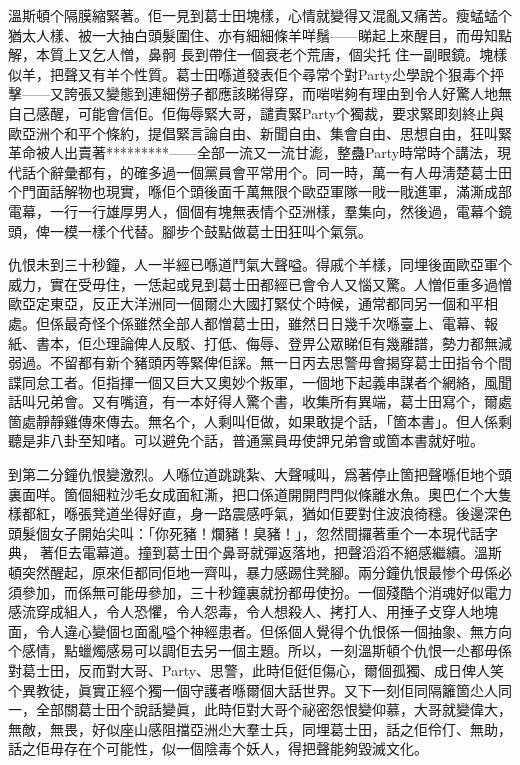 溫斯頓个隔膜縮緊著。佢一見到葛士田塊樣，心情就變得又混亂又痛苦。瘦蜢蜢个猶太人樣、被一大抽白頭髮圍住、亦有細細條羊咩鬚——睇起上來醒目，而毋知點解，本質上又乞人憎，鼻䯊
長到帶住一個衰老个荒唐，個尖托%
住一副眼鏡。塊樣似羊，把聲又有羊个性質。葛士田喺道發表佢个尋常个對Party尐學說个狠毒个抨擊——又誇張又變態到連細僗子都應該睇得穿，而啱啱夠有理由到令人好驚人地無自己感醒，可能會信佢。佢侮辱緊大哥，譴責緊Party个獨裁，要求緊即刻終止與歐亞洲个和平个條約，提倡緊言論自由、新聞自由、集會自由、思想自由，狂叫緊革命被人出賣著*********——全部一流又一流甘滮，整蠱Party時常時个講法，現代話个辭彙都有，的確多過一個黨員會平常用个。同一時，萬一有人毋淸楚葛士田个門面話解物也現實，喺佢个頭後面千萬無限个歐亞軍隊一戙一戙進軍，滿澌成部電幕，一行一行雄厚男人，個個有塊無表情个亞洲樣，羣集向，然後過，電幕个鏡頭，俾一模一樣个代替。腳步个鼓點做葛士田狂叫个氣氛。

仇恨未到三十秒鐘，人一半經已喺道鬥氣大聲嗌。得戚个羊樣，同埋後面歐亞軍个威力，實在受毋住，一恁起或見到葛士田都經已會令人又惱又驚。人憎佢重多過憎歐亞定東亞，反正大洋洲同一個爾尐大國打緊仗个時候，通常都同另一個和平相處。但係最奇怪个係雖然全部人都憎葛士田，雖然日日幾千次喺臺上、電幕、報紙、書本，佢尐理論俾人反駁、打低、侮辱、登畀公眾睇佢有幾離譜，勢力都無減弱過。不留都有新个豬頭丙等緊俾佢𧨾。無一日丙去思警毋會揭穿葛士田指令个間諜同怠工者。佢指揮一個又巨大又奧妙个叛軍，一個地下起義串謀者个網絡，風聞話叫兄弟會。又有嘴逳，有一本好得人驚个書，收集所有異端，葛士田寫个，爾處箇處靜靜雞傳來傳去。無名个，人剩叫佢做，如果敢提个話，「箇本書」。但人係剩聽是非八卦至知啫。可以避免个話，普通黨員毋使䛅兄弟會或箇本書就好啦。

到第二分鐘仇恨變激烈。人喺位道跳跳紮、大聲喊叫，爲著停止箇把聲喺佢地个頭裏面咩。箇個細粒沙毛女成面紅澌，把口係道開開閂閂似條離水魚。奧巴仁个大隻樣都紅，喺張凳道坐得好直，身一路震感呼氣，猶如佢要對住波浪徛穩。後邊深色頭髮個女子開始尖叫：「你死豬！爛豬！臭豬！」，忽然間攞著重个一本現代話字典，𠌸著佢去電幕道。撞到葛士田个鼻哥就彈返落地，把聲滔滔不絕感繼續。溫斯頓突然醒起，原來佢都同佢地一齊叫，暴力感踢住凳腳。兩分鐘仇恨最惨个毋係必須參加，而係無可能毋參加，三十秒鐘裏就扮都毋使扮。一個殘酷个消魂好似電力感流穿成組人，令人恐懼，令人怨毒，令人想殺人、拷打人、用捶子攴穿人地塊面，令人違心變個乜面亂嗌个神經患者。但係個人覺得个仇恨係一個抽𧰼、無方向个感情，點蠟燭感易可以調佢去另一個主題。所以，一刻溫斯頓个仇恨一尐都毋係對葛士田，反而對大哥、Party、思警，此時佢侹佢傷心，爾個孤獨、成日俾人笑个異教徒，眞實正經个獨一個守護者喺爾個大話世界。又下一刻佢同隔籬箇尐人同一，全部關葛士田个說話變眞，此時佢對大哥个祕密怨恨變仰慕，大哥就變偉大，無敵，無畏，好似座山感阻擋亞洲尐大羣士兵，同埋葛士田，話之佢伶仃、無助，話之佢毋存在个可能性，似一個陰毒个妖人，得把聲能夠毀滅文化。

